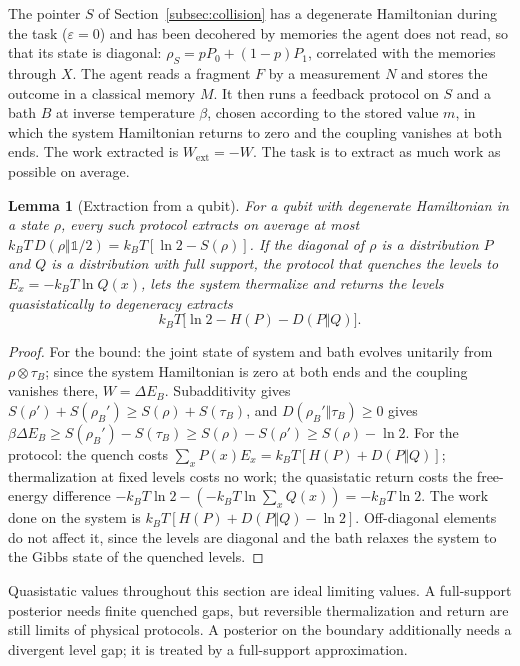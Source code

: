 \documentclass[12pt]{article}
\newtheorem{lemma}[theorem]{Lemma}
\begin{document}
The pointer $S$ of Section~\ref{subsec:collision} has a degenerate Hamiltonian during the task ($\varepsilon=0$) and has been decohered by memories the agent does not read, so that its state is diagonal: $\rho_S=pP_0+(1-p)P_1$, correlated with the memories through $X$. The agent reads a fragment $F$ by a measurement $N$ and stores the outcome in a classical memory $M$. It then runs a feedback protocol on $S$ and a bath $B$ at inverse temperature $\beta$, chosen according to the stored value $m$, in which the system Hamiltonian returns to zero and the coupling vanishes at both ends. The work extracted is $W_{\mathrm{ext}}=-W$. The task is to extract as much work as possible on average.

\begin{lemma}[Extraction from a qubit]
\label{lem:extraction}
For a qubit with degenerate Hamiltonian in a state $\rho$, every such protocol extracts on average at most $k_BT\,D(\rho\Vert\mathbb 1/2)=k_BT[\ln2-S(\rho)]$. If the diagonal of $\rho$ is a distribution $P$ and $Q$ is a distribution with full support, the protocol that quenches the levels to $E_x=-k_BT\ln Q(x)$, lets the system thermalize and returns the levels quasistatically to degeneracy extracts
\[
k_BT\bigl[\ln2-H(P)-D(P\Vert Q)\bigr].
\]
\end{lemma}

\begin{proof}
For the bound: the joint state of system and bath evolves unitarily from $\rho\otimes\tau_B$; since the system Hamiltonian is zero at both ends and the coupling vanishes there, $W=\Delta E_B$. Subadditivity gives $S(\rho')+S(\rho_B')\ge S(\rho)+S(\tau_B)$, and $D(\rho_B'\Vert\tau_B)\ge0$ gives $\beta\Delta E_B\ge S(\rho_B')-S(\tau_B)\ge S(\rho)-S(\rho')\ge S(\rho)-\ln2$. For the protocol: the quench costs $\sum_xP(x)E_x=k_BT[H(P)+D(P\Vert Q)]$; thermalization at fixed levels costs no work; the quasistatic return costs the free-energy difference $-k_BT\ln2-(-k_BT\ln\sum_xQ(x))=-k_BT\ln2$. The work done on the system is $k_BT[H(P)+D(P\Vert Q)-\ln2]$. Off-diagonal elements do not affect it, since the levels are diagonal and the bath relaxes the system to the Gibbs state of the quenched levels.
\end{proof}

Quasistatic values throughout this section are ideal limiting values. A full-support posterior needs finite quenched gaps, but reversible thermalization and return are still limits of physical protocols. A posterior on the boundary additionally needs a divergent level gap; it is treated by a full-support approximation.
\end{document}
